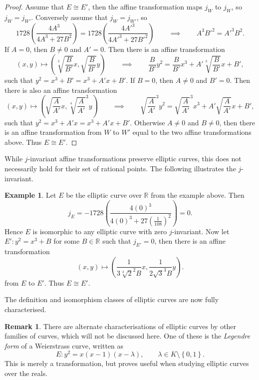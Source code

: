 \documentclass{article}
\newcommand{\R}{\mathbb{R}}
\newcommand{\rb}[1]{\left( #1 \right)}
\newcommand{\cb}[1]{\left\{ #1 \right\}}
\theoremstyle{definition}\newtheorem*{definition}{Definition}
\theoremstyle{definition}\newtheorem*{example}{Example}
\theoremstyle{definition}\newtheorem*{remark}{Remark}
\begin{document}
\begin{proof}
Assume that $ E \cong E' $, then the affine transformation maps $ j_W $ to $ j_W $, so $ j_W = j_{W'} $. Conversely assume that $ j_W = j_{W'} $, so
$$ 1728\rb{\dfrac{4A^3}{4A^3 + 27B^2}} = 1728\rb{\dfrac{4A'^3}{4A'^3 + 27B'^2}} \qquad \implies \qquad A^3B'^2 = A'^3B^2. $$
If $ A = 0 $, then $ B \ne 0 $ and $ A' = 0 $. Then there is an affine transformation
$$ \rb{x, y} \mapsto \rb{\sqrt[3]{\dfrac{B}{B'}}x, \sqrt{\dfrac{B}{B'}}y} \qquad \implies \qquad \dfrac{B}{B'}y^2 = \dfrac{B}{B'}x^3 + A'\sqrt[3]{\dfrac{B}{B'}}x + B', $$
such that $ y^2 = x^3 + B' = x^3 + A'x + B' $. If $ B = 0 $, then $ A \ne 0 $ and $ B' = 0 $. Then there is also an affine transformation
$$ \rb{x, y} \mapsto \rb{\sqrt{\dfrac{A}{A'}}x, \sqrt[4]{\dfrac{A}{A'}}^3y} \qquad \implies \qquad \sqrt{\dfrac{A}{A'}}^3y^2 = \sqrt{\dfrac{A}{A'}}^3x^3 + A'\sqrt{\dfrac{A}{A'}}x + B', $$
such that $ y^2 = x^3 + A'x = x^3 + A'x + B' $. Otherwise $ A \ne 0 $ and $ B \ne 0 $, then there is an affine transformation from $ W $ to $ W' $ equal to the two affine transformations above. Thus $ E \cong E' $.
\end{proof}

While $ j $-invariant affine transformations preserve elliptic curves, this does not necessarily hold for their set of rational points. The following illustrates the $ j $-invariant.

\begin{example}
Let $ E $ be the elliptic curve over $ \R $ from the example above. Then
$$ j_E = -1728\rb{\dfrac{4\rb{0}^3}{4\rb{0}^3 + 27\rb{\frac{1}{108}}^2}} = 0. $$
Hence $ E $ is isomorphic to any elliptic curve with zero $ j $-invariant. Now let $ E' : y^2 = x^3 + B $ for some $ B \in \R $ such that $ j_{E'} = 0 $, then there is an affine transformation
$$ \rb{x, y} \mapsto \rb{\dfrac{1}{3\sqrt[3]{2}^2B}x, \dfrac{1}{2\sqrt{3}^3B}y}. $$
from $ E $ to $ E' $. Thus $ E \cong E' $.
\end{example}

The definition and isomorphism classes of elliptic curves are now fully characterised.

\begin{remark}
There are alternate characterisations of elliptic curves by other families of curves, which will not be discussed here. One of these is the \emph{Legendre form} of a Weierstrass curve, written as
$$ E : y^2 = x\rb{x - 1}\rb{x - \lambda}, \qquad \lambda \in K \setminus \cb{0, 1}. $$
This is merely a transformation, but proves useful when studying elliptic curves over the reals.
\end{remark}
\end{document}

